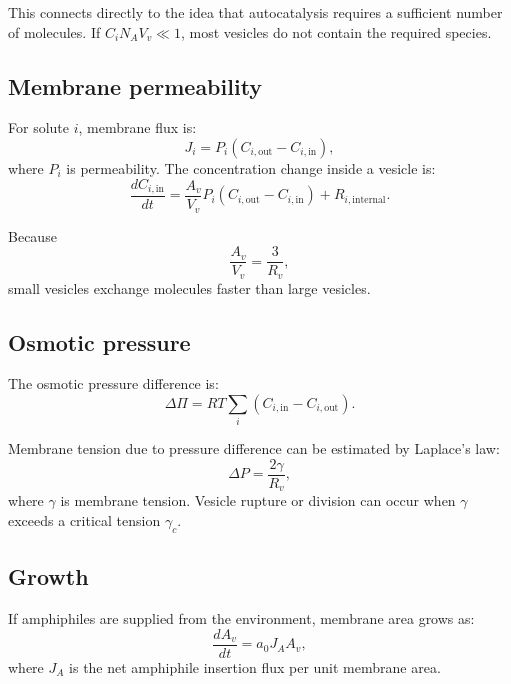 \documentclass[11pt]{article}
\begin{document}
This connects directly to the idea that autocatalysis requires a sufficient
number of molecules. If $C_i N_A V_v \ll 1$, most vesicles do not contain the
required species.

\subsection{Membrane permeability}

For solute $i$, membrane flux is:
\begin{equation}
    J_i =
    P_i \left(C_{i,\mathrm{out}}-C_{i,\mathrm{in}}\right),
\end{equation}
where $P_i$ is permeability. The concentration change inside a vesicle is:
\begin{equation}
    \frac{dC_{i,\mathrm{in}}}{dt}
    =
    \frac{A_v}{V_v}
    P_i
    \left(C_{i,\mathrm{out}}-C_{i,\mathrm{in}}\right)
    +
    R_{i,\mathrm{internal}}.
\end{equation}

Because
\begin{equation}
    \frac{A_v}{V_v} = \frac{3}{R_v},
\end{equation}
small vesicles exchange molecules faster than large vesicles.

\subsection{Osmotic pressure}

The osmotic pressure difference is:
\begin{equation}
    \Delta \Pi =
    RT
    \sum_i
    \left(
    C_{i,\mathrm{in}} - C_{i,\mathrm{out}}
    \right).
\end{equation}

Membrane tension due to pressure difference can be estimated by Laplace's law:
\begin{equation}
    \Delta P =
    \frac{2\gamma}{R_v},
\end{equation}
where $\gamma$ is membrane tension. Vesicle rupture or division can occur when
$\gamma$ exceeds a critical tension $\gamma_c$.

\subsection{Growth}

If amphiphiles are supplied from the environment, membrane area grows as:
\begin{equation}
    \frac{dA_v}{dt}
    =
    a_0 J_A A_v,
\end{equation}
where $J_A$ is the net amphiphile insertion flux per unit membrane area.
\end{document}
